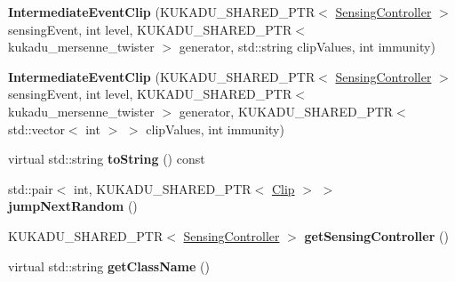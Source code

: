 \begin{DoxyCompactItemize}
\item 
{\bfseries Intermediate\+Event\+Clip} (K\+U\+K\+A\+D\+U\+\_\+\+S\+H\+A\+R\+E\+D\+\_\+\+P\+TR$<$ \hyperlink{classkukadu_1_1SensingController}{Sensing\+Controller} $>$ sensing\+Event, int level, K\+U\+K\+A\+D\+U\+\_\+\+S\+H\+A\+R\+E\+D\+\_\+\+P\+TR$<$ kukadu\+\_\+mersenne\+\_\+twister $>$ generator, std\+::string clip\+Values, int immunity)\hypertarget{classkukadu_1_1IntermediateEventClip_a91279d5477030bfdd9adf95864fbff04}{}\label{classkukadu_1_1IntermediateEventClip_a91279d5477030bfdd9adf95864fbff04}

\item 
{\bfseries Intermediate\+Event\+Clip} (K\+U\+K\+A\+D\+U\+\_\+\+S\+H\+A\+R\+E\+D\+\_\+\+P\+TR$<$ \hyperlink{classkukadu_1_1SensingController}{Sensing\+Controller} $>$ sensing\+Event, int level, K\+U\+K\+A\+D\+U\+\_\+\+S\+H\+A\+R\+E\+D\+\_\+\+P\+TR$<$ kukadu\+\_\+mersenne\+\_\+twister $>$ generator, K\+U\+K\+A\+D\+U\+\_\+\+S\+H\+A\+R\+E\+D\+\_\+\+P\+TR$<$ std\+::vector$<$ int $>$ $>$ clip\+Values, int immunity)\hypertarget{classkukadu_1_1IntermediateEventClip_a880dddcacad2b7cd26be43bdf62cd11a}{}\label{classkukadu_1_1IntermediateEventClip_a880dddcacad2b7cd26be43bdf62cd11a}

\item 
virtual std\+::string {\bfseries to\+String} () const \hypertarget{classkukadu_1_1IntermediateEventClip_aa2aeb835bcd24ad8503ddebee554fbac}{}\label{classkukadu_1_1IntermediateEventClip_aa2aeb835bcd24ad8503ddebee554fbac}

\item 
std\+::pair$<$ int, K\+U\+K\+A\+D\+U\+\_\+\+S\+H\+A\+R\+E\+D\+\_\+\+P\+TR$<$ \hyperlink{classkukadu_1_1Clip}{Clip} $>$ $>$ {\bfseries jump\+Next\+Random} ()\hypertarget{classkukadu_1_1IntermediateEventClip_a471a55d04d08972093c618d383af1213}{}\label{classkukadu_1_1IntermediateEventClip_a471a55d04d08972093c618d383af1213}

\item 
K\+U\+K\+A\+D\+U\+\_\+\+S\+H\+A\+R\+E\+D\+\_\+\+P\+TR$<$ \hyperlink{classkukadu_1_1SensingController}{Sensing\+Controller} $>$ {\bfseries get\+Sensing\+Controller} ()\hypertarget{classkukadu_1_1IntermediateEventClip_af486d261e5b163d86b5bfe87fd7a41a7}{}\label{classkukadu_1_1IntermediateEventClip_af486d261e5b163d86b5bfe87fd7a41a7}

\item 
virtual std\+::string {\bfseries get\+Class\+Name} ()\hypertarget{classkukadu_1_1IntermediateEventClip_af46edde9850888b78d336405e6c7e6bd}{}\label{classkukadu_1_1IntermediateEventClip_af46edde9850888b78d336405e6c7e6bd}

\end{DoxyCompactItemize}
